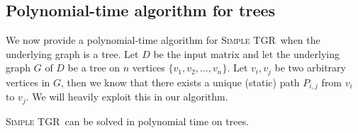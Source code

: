 \documentclass[a4paper,UKenglish,cleveref, autoref, thm-restate, anonymous]{lipics-v2021}
\newcommand{\deltaExact}{\textsc{Simple TGR}}
\begin{document}
\subsection{Polynomial-time algorithm for trees}\label{sec:treealgo}
We now provide a polynomial-time algorithm for \deltaExact\ when the underlying graph is a tree.
Let $D$ be the input matrix and let the underlying graph $G$ of $D$ be a tree on $n$ vertices $\{v_1, v_2, \dots, v_n\}$.
Let $v_i,v_j$ be two arbitrary vertices in $G$, then we know that there exists a unique (static) path $P_{i,j}$ from $v_i$ to $v_j$. We will heavily exploit this in our algorithm.



\begin{theorem}[$\star$] \label{thm:deltaExact-PolyTimeTrees}
    \deltaExact\ can be solved in polynomial time on trees.
\end{theorem}
\end{document}
